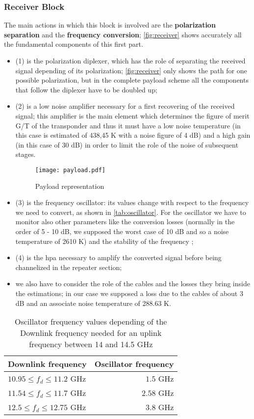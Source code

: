 \subsubsection{Receiver Block}
The main actions in which this block is involved are the \textbf{polarization separation} and the \textbf{frequency conversion}; \autoref{fig:receiver} shows accurately all the fundamental components of this first part.
\begin{itemize}
\item (1) is the polarization diplexer, which has the role of separating the received signal depending of its polarization; \autoref{fig:receiver} only shows the path for one possible polarization, but in the complete payload scheme all the components that follow the diplexer have to be doubled up;
\item (2) is a low noise amplifier necessary for a first recovering of the received signal; this amplifier is the main element which determines the figure of merit G/T of the transponder and thus it must have a low noise temperature (in this case is estimated of 438,45 K with a noise figure of 4 dB) and a high gain (in this case of 30 dB) in order to limit the role of the noise of subsequent stages.
\begin{sidewaysfigure}
\centering
\texttt{[image: payload.pdf]}
\caption{Payload representation}
\label{fig:payload}
\end{sidewaysfigure}
\item (3) is the frequency oscillator: its values change with respect to the frequency we need to convert, as shown in \autoref{tab:oscillator}. For the oscillator we have to monitor also other parameters like the conversion losses (normally in the order of 5 - 10 dB, we supposed the worst case of 10 dB and so a noise temperature of 2610 K) and the stability of the frequency \cite{Maral2017};
\item (4) is the \gls{hpa} necessary to amplify the converted signal before being channelized in the repeater section;
\item we also have to consider the role of the cables and the losses they bring inside the estimations; in our case we supposed a loss due to the cables of about 3 dB \cite{Ippolito17} and an associate noise temperature of 288.63 K.
\end{itemize}
	\begin{table}
	\centering
	\begin{tabular}{lr}
	\toprule
	Downlink frequency & Oscillator frequency\\
	\midrule
	$10.95 \leq f_d \leq 11.2$ GHz & $1.5$ GHz\\
	$11.54 \leq f_d \leq 11.7$ GHz & $2.58$ GHz\\
	$12.5 \leq f_d \leq 12.75$ GHz & $3.8$ GHz\\
	\bottomrule
	\end{tabular}
	\caption{Oscillator frequency values depending of the Downlink frequency needed for an uplink frequency between 14 and 14.5 GHz}
	\label{tab:oscillator}
\end{table}
